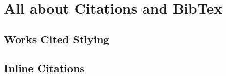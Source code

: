 \documentclass[./dissertation.tex]{subfiles}
\begin{document}
    \chapter{All about Citations and BibTex}
    \section{Works Cited Stlying}
    \section{Inline Citations}
\end{document}
